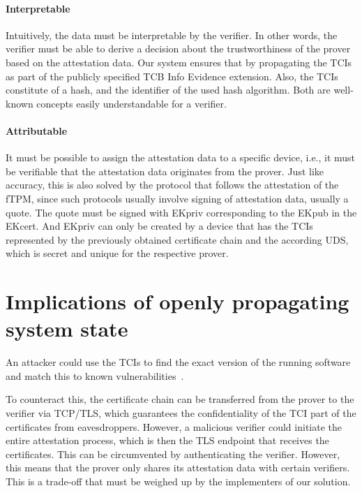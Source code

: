 \paragraph{Interpretable}
Intuitively, the data must be interpretable by the verifier.
In other words, the verifier must be able to derive a decision about the trustworthiness of the prover based on the attestation data.
Our system ensures that by propagating the TCIs as part of the publicly specified TCB Info Evidence extension.
Also, the TCIs constitute of a hash, and the identifier of the used hash algorithm.
Both are well-known concepts easily understandable for a verifier.

\paragraph{Attributable}
It must be possible to assign the attestation data to a specific device, i.e., it must be verifiable that the attestation data originates from the prover.
Just like accuracy, this is also solved by the protocol that follows the attestation of the fTPM, since such protocols usually involve signing of attestation data, usually a quote.
The quote must be signed with EKpriv corresponding to the EKpub in the EKcert.
And EKpriv can only be created by a device that has the \acp{TCI} represented by the previously obtained certificate chain and the according \ac{UDS}, which is secret and unique for the respective prover.



\section{Implications of openly propagating system state}

An attacker could use the TCIs to find the exact version of the running software and match this to known vulnerabilities~\cite{rfc9334}.

To counteract this, the certificate chain can be transferred from the prover to the verifier via TCP/TLS, which guarantees the confidentiality of the TCI part of the certificates from eavesdroppers.
However, a malicious verifier could initiate the entire attestation process, which is then the TLS endpoint that receives the certificates.
This can be circumvented by authenticating the verifier.
However, this means that the prover only shares its attestation data with certain verifiers.
This is a trade-off that must be weighed up by the implementers of our solution.


